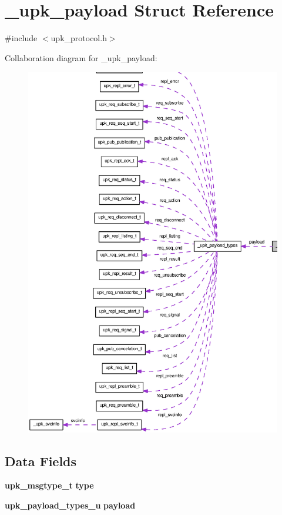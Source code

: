 \section{\_\-upk\_\-payload Struct Reference}
\label{struct__upk__payload}


{\ttfamily \#include $<$upk\_\-protocol.h$>$}



Collaboration diagram for \_\-upk\_\-payload:
\nopagebreak
\begin{figure}[H]
\begin{center}
\leavevmode
\includegraphics[width=400pt]{struct__upk__payload__coll__graph}
\end{center}
\end{figure}
\subsection*{Data Fields}
\begin{DoxyCompactItemize}
\item 
{\bf upk\_\-msgtype\_\-t} {\bf type}
\item 
{\bf upk\_\-payload\_\-types\_\-u} {\bf payload}
\end{DoxyCompactItemize}



